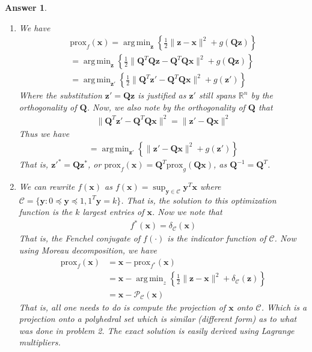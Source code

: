 \documentclass[12pt]{article}
\DeclareMathOperator*{\argmin}{arg\,min}
\theoremstyle{colon}
\newtheorem*{answer}{Answer}
\begin{document}
\begin{answer}
\begin{enumerate}[label=\alph*)]
		\item We have
			\begin{gather*}
				\text{prox}_f(\bm{x}) = \argmin_{\bm{z}} \left\{ \frac{1}{2} \lVert \bm{z} - \bm{x} \rVert^2 + g(\bm{Q} \bm{z}) \right\} \\
				= \argmin_{\bm{z}} \left\{ \frac{1}{2} \lVert \bm{Q}^T \bm{Q} \bm{z} - \bm{Q}^T \bm{Q} \bm{x} \rVert^2 + g(\bm{Q} \bm{z}) \right\} \\
				= \argmin_{\bm{z}'} \left\{ \frac{1}{2} \lVert \bm{Q}^T \bm{z}' - \bm{Q}^T \bm{Q} \bm{x} \rVert^2 + g(\bm{z}') \right\}
			\end{gather*}
			Where the substitution $\bm{z}' = \bm{Q} \bm{z}$ is justified as $\bm{z}'$ still spans $\mathbb{R}^n$ by the orthogonality of $\bm{Q}$. Now, we also note by the orthogonality of $\bm{Q}$ that
			\begin{gather*}
				\lVert \bm{Q}^T \bm{z}' - \bm{Q}^T \bm{Q} \bm{x} \rVert^2 = \lVert \bm{z}' - \bm{Q} \bm{x} \rVert^2
			\end{gather*}
			Thus we have
			\begin{gather*}
				= \argmin_{\bm{z}'} \left\{\lVert \bm{z}' - \bm{Q} \bm{x} \rVert^2 + g(\bm{z}') \right\}
			\end{gather*}
			That is, $\bm{z}'^* = \bm{Q} \bm{z}^*$, or $\text{prox}_f(\bm{x}) = \bm{Q}^T \text{prox}_g (\bm{Q} \bm{x})$, as $\bm{Q}^{-1} = \bm{Q}^T$.

		\item We can rewrite $f(\bm{x})$ as $f(\bm{x}) = \sup_{\bm{y} \in \mathcal{C}} \bm{y}^T \bm{x}$ where $\mathcal{C} = \{ \bm{y} : 0 \preceq \bm{y} \preceq 1, 1^T \bm{y} = k \}$. That is, the solution to this optimization function is the $k$ largest entries of $\bm{x}$. Now we note that
			\begin{gather*}
				f^*(\bm{x}) = \delta_{\mathcal{C}}(\bm{x})
			\end{gather*}
			That is, the Fenchel conjugate of $f(\cdot)$ is the indicator function of $\mathcal{C}$. Now using Moreau decomposition, we have
			\begin{align*}
				\text{prox}_{f} (\bm{x}) &= \bm{x} - \text{prox}_{f^*} (\bm{x}) \\
				&= \bm{x} - \argmin_z \left\{ \frac{1}{2} \lVert \bm{z} - \bm{x} \rVert^2 + \delta_{\mathcal{C}} (\bm{z}) \right\} \\
				&= \bm{x} - \mathcal{P}_{\mathcal{C}}(\bm{x})
			\end{align*}
			That is, all one needs to do is compute the projection of $\bm{x}$ onto $\mathcal{C}$. Which is a projection onto a polyhedral set which is similar (different form) as to what was done in problem 2. The exact solution is easily derived using Lagrange multipliers.
	\end{enumerate}

\end{answer}
\end{document}
